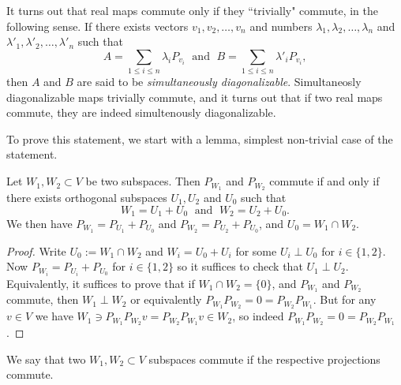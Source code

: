 It turns out that real maps commute only if they ``trivially" commute, in the following sense. If there exists vectors $v_{1}, v_{2}, \ldots, v_{n}$ and numbers $\lambda_{1}, \lambda_{2}, \ldots, \lambda_{n}$ and $\lambda'_{1}, \lambda'_{2}, \ldots, \lambda'_{n}$ such that
\[
	A = \sum_{1 \leq i \leq n} \lambda_{i} P_{v_{i}} \; \text{ and } \; B = \sum_{1 \leq i \leq n} \lambda'_{i} P_{v_{i}},
\]
then $A$ and $B$ are said to be \textit{simultaneously diagonalizable}. Simultaneosly diagonalizable maps trivially commute, and it turns out that if two real maps commute, they are indeed simultenously diagonalizable.

To prove this statement, we start with a lemma, simplest non-trivial case of the statement.

\begin{lem}\label{projectionLemma}
	Let $W_{1}, W_{2} \subset V$ be two subspaces. Then $P_{W_{1}}$ and $P_{W_{2}}$ commute if and only if there exists orthogonal subspaces $U_{1}, U_{2}$ and $U_{0}$ such that
	\[
		W_{1} = U_{1} + U_{0}  \; \text{ and } \; W_{2} = U_{2} + U_{0}.
	\]
	We then have $P_{W_{1}} = P_{U_{1}} + P_{U_{0}}$ and $P_{W_{2}} = P_{U_{2}} + P_{U_{0}}$, and $U_{0} = W_{1} \cap W_{2}$.
\end{lem}
\begin{proof}
	Write $U_{0} := W_{1} \cap W_{2}$ and $W_{i} = U_{0} + U_{i}$ for some $U_{i} \perp U_{0}$ for $i \in \{1, 2\}$. Now $P_{W_{i}} = P_{U_{i}} + P_{U_{0}}$ for $i \in \{1, 2\}$ so it suffices to check that $U_{1} \perp U_{2}$. Equivalently, it suffices to prove that if $W_{1} \cap W_{2} = \{0\}$, and $P_{W_{1}}$ and $P_{W_{2}}$ commute, then $W_{1} \perp W_{2}$ or equivalently $P_{W_{1}}P_{W_{2}} = 0 = P_{W_{2}}P_{W_{1}}$. But for any $v \in V$ we have $W_{1} \ni P_{W_{1}}P_{W_{2}}v = P_{W_{2}}P_{W_{1}}v \in W_{2}$, so indeed $P_{W_{1}}P_{W_{2}} = 0 = P_{W_{2}}P_{W_{1}}$.
\end{proof}

\begin{maar}
	We say that two $W_{1}, W_{2} \subset V$ subspaces commute if the respective projections commute.
\end{maar}

